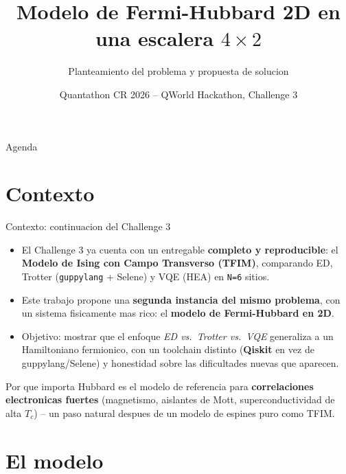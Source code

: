 \documentclass[aspectratio=169,10pt]{beamer}
\title[Fermi-Hubbard 2D: planteamiento y propuesta]{Modelo de Fermi-Hubbard 2D en una escalera $4\times2$}
\subtitle{Planteamiento del problema y propuesta de solucion}
\author{Quantathon CR 2026 -- QWorld Hackathon, Challenge 3}
\date{}
\newcommand{\good}[1]{\textcolor{qAccent}{\textbf{#1}}}
\begin{document}
\begin{frame}
  \titlepage
\end{frame}

\begin{frame}{Agenda}
  \tableofcontents
\end{frame}

\section{Contexto}

\begin{frame}{Contexto: continuacion del Challenge 3}
  \begin{itemize}
    \item El Challenge 3 ya cuenta con un entregable \good{completo y reproducible}: el
      \textbf{Modelo de Ising con Campo Transverso (TFIM)}, comparando ED, Trotter
      (\texttt{guppylang} + Selene) y VQE (HEA) en \texttt{N=6} sitios.
    \item Este trabajo propone una \textbf{segunda instancia del mismo problema}, con un
      sistema fisicamente mas rico: el \textbf{modelo de Fermi-Hubbard en 2D}.
    \item Objetivo: mostrar que el enfoque \emph{ED vs.\ Trotter vs.\ VQE} generaliza a un
      Hamiltoniano fermionico, con un toolchain distinto (\textbf{Qiskit} en vez de
      guppylang/Selene) y honestidad sobre las dificultades nuevas que aparecen.
  \end{itemize}
  \vspace{1em}
  \begin{block}{Por que importa}
    Hubbard es el modelo de referencia para \textbf{correlaciones electronicas fuertes}
    (magnetismo, aislantes de Mott, superconductividad de alta $T_c$) -- un paso natural
    despues de un modelo de espines puro como TFIM.
  \end{block}
\end{frame}

\section{El modelo}
\end{document}
